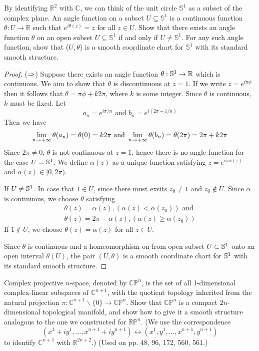 \begin{problem}
    By identifying $\mathbb{R}^2$ with $\mathbb{C}$, we can think of the unit circle $\mathbb{S}^1$ as a subset of the complex plane. An angle function on a subset $U \subseteq \mathbb{S}^1$ is a continuous function $\theta: U \rightarrow \mathbb{R}$ such that $e^{i \theta(z)}=z$ for all $z \in U$. Show that there exists an angle function $\theta$ on an open subset $U \subseteq \mathbb{S}^1$ if and only if $U \neq \mathbb{S}^1$. For any such angle function, show that ($U, \theta$) is a smooth coordinate chart for $\mathbb{S}^1$ with its standard smooth structure.
\end{problem}
\begin{proof}
    ($\Rightarrow$) Suppose there exists an angle function $\theta:\mathbb{S}^1 \to \mathbb{R}$ which is continuous. We aim to show that $\theta$ is discontinuous at $z = 1$. If we write $z = e^{i\pi \phi}$ then it follows that $\theta = \pi\phi + k2\pi$, where $k$ is some integer. Since $\theta$ is continuous, $k$ must be fixed. Let 
    \[
        a_n = e^{i\pi/n} \text{ and }b_n = e^{i(2\pi - 1/n)}
    \]
    Then we have 
    \[
        \displaystyle \lim_{n \to +\infty} \theta(a_n) = \theta(0) = k2\pi\text{ and }\displaystyle \lim_{n \to +\infty}\theta(b_n) =  \theta(2\pi) = 2\pi + k2\pi
    \]
    Since $2\pi \neq 0$, $\theta$ is not continuous at $z = 1$, hence there is no angle function for the case $U = \mathbb{S}^1$. We define $\alpha(z)$  as a unique function satisfying $z = e^{i\pi\alpha(z)}$ and $\alpha(z) \in [0,2\pi)$.
    
    If $U \neq \mathbb{S}^1$. In case that $1 \in U$, since there must exsits $z_0 \neq 1$ and $z_0 \notin U$. Since $\alpha$ is continuous, we choose  $\theta$ satisfying
    \begin{align*}
         \theta(z) = \alpha(z) , ( \alpha(z)  < \alpha(z_0) ) \text{ and }\\
         \theta(z)=2\pi -  \alpha(z) , ( \alpha(z)  \geq \alpha(z_0) )
    \end{align*}
    If  $1 \notin U$, we choose $\theta(z) = \alpha(z)$ for all $z\in U$.  

    Since $\theta$ is continuous and a homeomorphism on from open subset $U \subset \mathbb{S}^1$ onto an open interval $\theta(U)$, the pair $(U,\theta)$ is a smooth coordinate chart for $\mathbb{S}^1$ with its standard smooth structure.
\end{proof}
\begin{problem}
     Complex projective $n$-space, denoted by $\mathbb{C P}^n$, is the set of all 1-dimensional complex-linear subspaces of $\mathbb{C}^{n+1}$, with the quotient topology inherited from the natural projection $\pi: \mathbb{C}^{n+1} \backslash\{0\} \rightarrow \mathbb{C} \mathbb{P}^n$. Show that $\mathbb{C} \mathbb{P}^n$ is a compact $2 n$-dimensional topological manifold, and show how to give it a smooth structure analogous to the one we constructed for $\mathbb{R P}^n$. (We use the correspondence
$$
\left(x^1+i y^1, \ldots, x^{n+1}+i y^{n+1}\right) \leftrightarrow\left(x^1, y^1, \ldots, x^{n+1}, y^{n+1}\right)
$$
to identify $\mathbb{C}^{n+1}$ with $\mathbb{R}^{2 n+2}$.) (Used on pp. 48, 96, 172, 560, 561.)
\end{problem}
